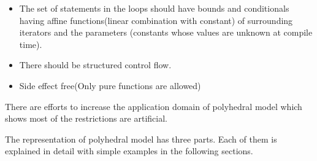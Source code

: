 \begin{itemize}
\item The set of statements in the loops should have bounds and conditionals having affine functions(linear
combination with constant) of surrounding iterators and the parameters (constants whose values are unknown at compile time).
\item There should be structured control flow.
\item Side effect free(Only pure functions are allowed)
\end{itemize}

There are efforts to increase the application domain of polyhedral model \cite{Benabderrahmane}
which shows most of the restrictions are artificial.

The representation of polyhedral model has three parts. Each of them is explained in detail with simple
examples in the following sections.

